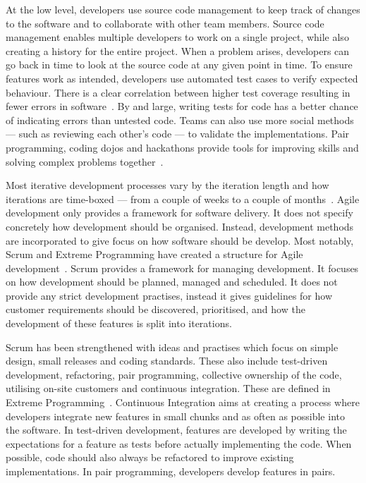 \documentclass[english]{tktltiki2}
\begin{document}
At the low level, developers use source code management to keep track of changes to the software and to collaborate with other team members. Source code management enables multiple developers to work on a single project, while also creating a history for the entire project. When a problem arises, developers can go back in time to look at the source code at any given point in time. To ensure features work as intended, developers use automated test cases to verify expected behaviour. There is a clear correlation between higher test coverage resulting in fewer errors in software~\cite{MND09}. By and large, writing tests for code has a better chance of indicating errors than untested code. Teams can also use more social methods — such as reviewing each other’s code — to validate the implementations. Pair programming, coding dojos and hackathons provide tools for improving skills and solving complex problems together~\cite{DD08, HHL13, RKD13}.

Most iterative development processes vary by the iteration length and how iterations are time-boxed — from a couple of weeks to a couple of months~\cite{LB03}. Agile development only provides a framework for software delivery. It does not specify concretely how development should be organised. Instead, development methods are incorporated to give focus on how software should be develop. Most notably, Scrum and Extreme Programming have created a structure for Agile development~\cite{LB03, Fow05, SS10}. Scrum provides a framework for managing development. It focuses on how development should be planned, managed and scheduled. It does not provide any strict development practises, instead it gives guidelines for how customer requirements should be discovered, prioritised, and how the development of these features is split into iterations.

Scrum has been strengthened with ideas and practises which focus on simple design, small releases and coding standards. These also include test-driven development, refactoring, pair programming, collective ownership of the code, utilising on-site customers and continuous integration. These are defined in Extreme Programming~\cite{Bec00}. Continuous Integration aims at creating a process where developers integrate new features in small chunks and as often as possible into the software. In test-driven development, features are developed by writing the expectations for a feature as tests before actually implementing the code. When possible, code should also always be refactored to improve existing implementations. In pair programming, developers develop features in pairs.
\end{document}
